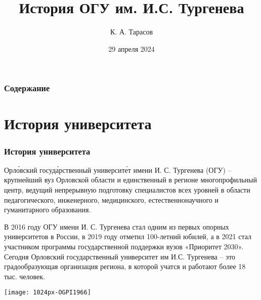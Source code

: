 \documentclass{beamer}
\title{История ОГУ им. И.С. Тургенева}
\author{К. А. Тарасов}
\institute{ОГУ им. И.С. Тургенева}
\date{29 апреля 2024}
\begin{document}
\frame{\titlepage}

\begin{frame}

\frametitle{Содержание}
\tableofcontents

\end{frame}
\section{История университета}
\begin{frame}\frametitle{История университета}
\begin{center}
\alert{Орло́вский госуда́рственный университе́т имени И. С. Тургенева (ОГУ)} – крупнейший вуз Орловской области и единственный в регионе многопрофильный центр, ведущий непрерывную подготовку специалистов всех уровней в области педагогического, инженерного, медицинского, естественнонаучного и гуманитарного образования.

В 2016 году ОГУ имени И. С. Тургенева стал одним из первых опорных университетов в России, в 2019 году отметил 100-летний юбилей, а в 2021 стал участником программы государственной поддержки вузов «Приоритет 2030».
Сегодня \alert{Орловский государственный университет им И.С. Тургенева} – это градообразующая организация региона, в которой учатся и работают более 18 тыс. человек. 
\end{center}
\begin{center}
\texttt{[image: 1024px-OGPI1966]}
\end{center}
\end{frame}
\end{document}
